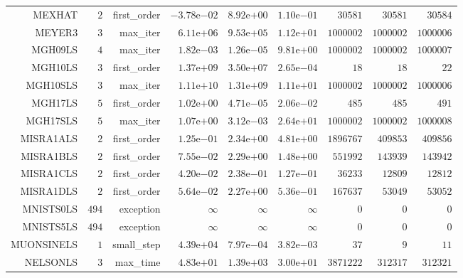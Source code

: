 \begin{longtable}{rrrrrrrrr}
MEXHAT & \(     2\) & first\_order & \(-3.78\)e\(-02\) & \( 8.92\)e\(+00\) & \( 1.10\)e\(-01\) & \( 30581\) & \( 30581\) & \( 30584\) \\
MEYER3 & \(     3\) & max\_iter & \( 6.11\)e\(+06\) & \( 9.53\)e\(+05\) & \( 1.12\)e\(+01\) & \(1000002\) & \(1000002\) & \(1000006\) \\
MGH09LS & \(     4\) & max\_iter & \( 1.82\)e\(-03\) & \( 1.26\)e\(-05\) & \( 9.81\)e\(+00\) & \(1000002\) & \(1000002\) & \(1000007\) \\
MGH10LS & \(     3\) & first\_order & \( 1.37\)e\(+09\) & \( 3.50\)e\(+07\) & \( 2.65\)e\(-04\) & \(    18\) & \(    18\) & \(    22\) \\
MGH10SLS & \(     3\) & max\_iter & \( 1.11\)e\(+10\) & \( 1.31\)e\(+09\) & \( 1.11\)e\(+01\) & \(1000002\) & \(1000002\) & \(1000006\) \\
MGH17LS & \(     5\) & first\_order & \( 1.02\)e\(+00\) & \( 4.71\)e\(-05\) & \( 2.06\)e\(-02\) & \(   485\) & \(   485\) & \(   491\) \\
MGH17SLS & \(     5\) & max\_iter & \( 1.07\)e\(+00\) & \( 3.12\)e\(-03\) & \( 2.64\)e\(+01\) & \(1000002\) & \(1000002\) & \(1000008\) \\
MISRA1ALS & \(     2\) & first\_order & \( 1.25\)e\(-01\) & \( 2.34\)e\(+00\) & \( 4.81\)e\(+00\) & \(1896767\) & \(409853\) & \(409856\) \\
MISRA1BLS & \(     2\) & first\_order & \( 7.55\)e\(-02\) & \( 2.29\)e\(+00\) & \( 1.48\)e\(+00\) & \(551992\) & \(143939\) & \(143942\) \\
MISRA1CLS & \(     2\) & first\_order & \( 4.20\)e\(-02\) & \( 2.38\)e\(-01\) & \( 1.27\)e\(-01\) & \( 36233\) & \( 12809\) & \( 12812\) \\
MISRA1DLS & \(     2\) & first\_order & \( 5.64\)e\(-02\) & \( 2.27\)e\(+00\) & \( 5.36\)e\(-01\) & \(167637\) & \( 53049\) & \( 53052\) \\
MNISTS0LS & \(   494\) & exception & \(\infty\) & \(\infty\) & \(\infty\) & \(     0\) & \(     0\) & \(     0\) \\
MNISTS5LS & \(   494\) & exception & \(\infty\) & \(\infty\) & \(\infty\) & \(     0\) & \(     0\) & \(     0\) \\
MUONSINELS & \(     1\) & small\_step & \( 4.39\)e\(+04\) & \( 7.97\)e\(-04\) & \( 3.82\)e\(-03\) & \(    37\) & \(     9\) & \(    11\) \\
NELSONLS & \(     3\) & max\_time & \( 4.83\)e\(+01\) & \( 1.39\)e\(+03\) & \( 3.00\)e\(+01\) & \(3871222\) & \(312317\) & \(312321\) \\

\end{longtable}
